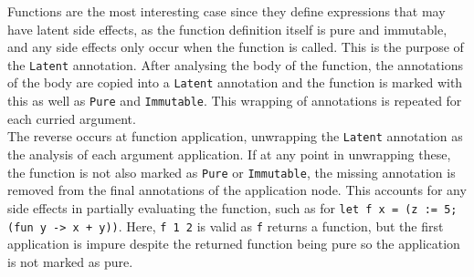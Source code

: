 Functions are the most interesting case since they define expressions that may have latent side effects, as the function definition itself is pure and immutable, and any side effects only occur when the function is called. This is the purpose of the \verb|Latent| annotation. After analysing the body of the function, the annotations of the body are copied into a \verb|Latent| annotation and the function is marked with this as well as \verb|Pure| and \verb|Immutable|. This wrapping of annotations is repeated for each curried argument. \\
The reverse occurs at function application, unwrapping the \verb|Latent| annotation as the analysis of each argument application. If at any point in unwrapping these, the function is not also marked as \verb|Pure| or \verb|Immutable|, the missing annotation is removed from the final annotations of the application node. This accounts for any side effects in partially evaluating the function, such as for \verb|let f x = (z := 5; (fun y -> x + y))|. Here, \verb|f 1 2| is valid as \verb|f| returns a function, but the first application is impure despite the returned function being pure so the application is not marked as pure.




